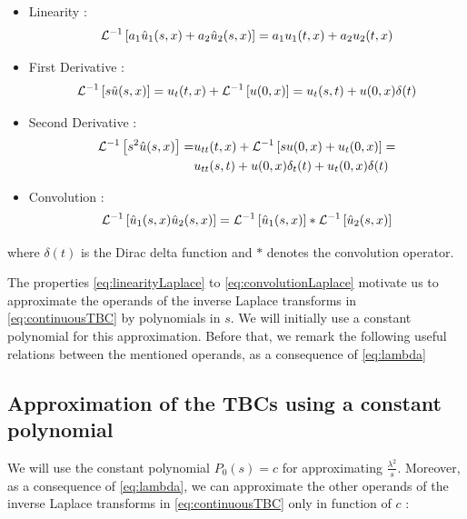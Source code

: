 \begin{itemize}
	\item Linearity :
		\begin{equation}
			\label{eq:linearityLaplace}
				\mathcal{L}^{-1} \left[a_1\hat{u}_1(s,x) + a_2\hat{u}_2(s,x)\right] = a_1u_1(t,x) + a_2u_2(t,x)
		\end{equation}
	\item First Derivative : 
		\begin{equation}
			\label{eq:firstDerivativeLaplace}
			\mathcal{L}^{-1} \left[ s\hat{u}(s,x) \right] = u_t(t,x) + \mathcal{L}^{-1} \left[ u(0,x) \right] =  u_t(s,t) +  u(0,x) \delta (t)
		\end{equation}
	\item Second Derivative : 
		\begin{equation}
			\label{eq:secondDerivativeLaplace}
			\begin{aligned}
			\mathcal{L}^{-1} \left[ s^2\hat{u}(s,x) \right] = & u_{tt}(t,x) + \mathcal{L}^{-1} \left[ su(0,x) + u_{t}(0,x)\right] = \\
																		   & u_{tt}(s,t) + u(0,x)\delta_t(t) +  u_t(0,x)\delta (t)
			\end{aligned}
		\end{equation}
	\item Convolution :
	\begin{equation}
		\label{eq:convolutionLaplace}
		\mathcal{L}^{-1} \left[ \hat{u}_1(s,x)\hat{u}_2(s,x)\right] = \mathcal{L}^{-1} \left[ \hat{u}_1(s,x)\right] * \mathcal{L}^{-1} \left[ \hat{u}_2(s,x)\right]
	\end{equation}
\end{itemize} 

\noindent where $\delta (t)$ is the Dirac delta function and $*$ denotes the convolution operator.

\indent The properties \eqref{eq:linearityLaplace} to \eqref{eq:convolutionLaplace} motivate us to approximate the operands of the inverse Laplace transforms in \eqref{eq:continuousTBC} by polynomials in $s$. We will initially use a constant polynomial for this approximation. Before that, we remark the following useful relations between the mentioned operands, as a consequence of \eqref{eq:lambda}

\subsection{Approximation of the TBCs using a constant polynomial}

\indent We will use the constant polynomial $P_0(s) = c$ for approximating $\frac{\lambda^2}{s}$. Moreover, as a consequence of \eqref{eq:lambda}, we can approximate the other operands of the inverse Laplace transforms in \eqref{eq:continuousTBC} only in function of $c$ :

